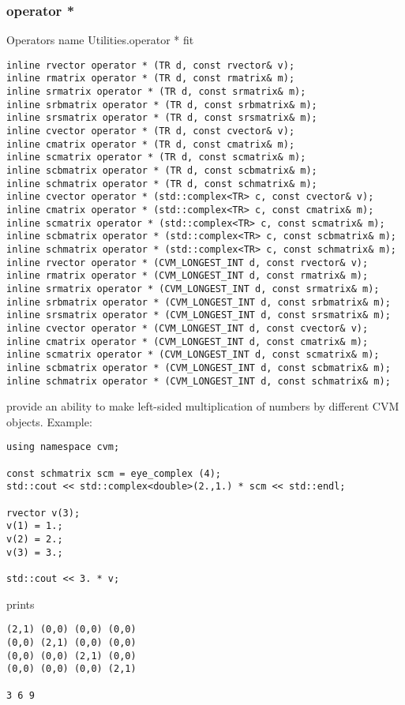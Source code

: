 \subsubsection{operator *}
Operators%
\pdfdest name {Utilities.operator *} fit
\begin{verbatim}
inline rvector operator * (TR d, const rvector& v);
inline rmatrix operator * (TR d, const rmatrix& m);
inline srmatrix operator * (TR d, const srmatrix& m);
inline srbmatrix operator * (TR d, const srbmatrix& m);
inline srsmatrix operator * (TR d, const srsmatrix& m);
inline cvector operator * (TR d, const cvector& v);
inline cmatrix operator * (TR d, const cmatrix& m);
inline scmatrix operator * (TR d, const scmatrix& m);
inline scbmatrix operator * (TR d, const scbmatrix& m);
inline schmatrix operator * (TR d, const schmatrix& m);
inline cvector operator * (std::complex<TR> c, const cvector& v);
inline cmatrix operator * (std::complex<TR> c, const cmatrix& m);
inline scmatrix operator * (std::complex<TR> c, const scmatrix& m);
inline scbmatrix operator * (std::complex<TR> c, const scbmatrix& m);
inline schmatrix operator * (std::complex<TR> c, const schmatrix& m);
inline rvector operator * (CVM_LONGEST_INT d, const rvector& v);
inline rmatrix operator * (CVM_LONGEST_INT d, const rmatrix& m);
inline srmatrix operator * (CVM_LONGEST_INT d, const srmatrix& m);
inline srbmatrix operator * (CVM_LONGEST_INT d, const srbmatrix& m);
inline srsmatrix operator * (CVM_LONGEST_INT d, const srsmatrix& m);
inline cvector operator * (CVM_LONGEST_INT d, const cvector& v);
inline cmatrix operator * (CVM_LONGEST_INT d, const cmatrix& m);
inline scmatrix operator * (CVM_LONGEST_INT d, const scmatrix& m);
inline scbmatrix operator * (CVM_LONGEST_INT d, const scbmatrix& m);
inline schmatrix operator * (CVM_LONGEST_INT d, const schmatrix& m);
\end{verbatim}
provide an ability to make left-sided multiplication of numbers
by different CVM objects.
Example:
\begin{Verbatim}
using namespace cvm;

const schmatrix scm = eye_complex (4);
std::cout << std::complex<double>(2.,1.) * scm << std::endl;

rvector v(3);
v(1) = 1.;
v(2) = 2.;
v(3) = 3.;

std::cout << 3. * v;
\end{Verbatim}
prints
\begin{Verbatim}
(2,1) (0,0) (0,0) (0,0)
(0,0) (2,1) (0,0) (0,0)
(0,0) (0,0) (2,1) (0,0)
(0,0) (0,0) (0,0) (2,1)

3 6 9
\end{Verbatim}
\newpage
